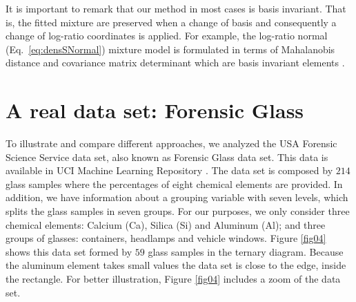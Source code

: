 \documentclass[10pt, a4paper]{article}
\begin{document}

% 

It is important to remark that our method in most cases is basis invariant. That is, the fitted mixture are preserved when a change of basis and consequently a change of log-ratio coordinates is applied. For example, the log-ratio normal (Eq.~\ref{eq:densSNormal}) mixture model is formulated in terms of Mahalanobis distance and covariance matrix determinant which are basis invariant elements
 \citep{barcelo1999comment}.

 

\section{A real data set: Forensic Glass}
\label{example_section}

\noindent To illustrate and compare different approaches, we analyzed the USA Forensic Science Service data set, also known as Forensic Glass data set. This data is available in UCI Machine Learning Repository \cite{Bache+Lichman:2013}.  The data set is composed by  $214$ glass samples where the percentages of eight chemical elements are provided. In addition, we have information about a grouping variable with seven levels, which splits the glass samples in seven groups. For our purposes, we only consider three chemical elements: Calcium (Ca), Silica (Si) and Aluminum (Al); and three groups of glasses: containers, headlamps and vehicle windows. Figure \ref{fig04} shows this data set formed by $59$ glass samples in the ternary diagram. Because the aluminum element takes small values the data set is close to the edge, inside the rectangle. For better illustration, Figure \ref{fig04} includes a zoom of the data set.
\end{document}
